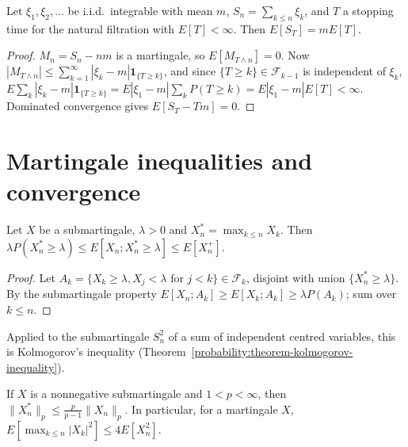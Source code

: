 \begin{theorem}\label{martingales:theorem-wald}
Let $\xi_1, \xi_2, \ldots$ be i.i.d.\ integrable with mean $m$, $S_n = \sum_{k \leq n}\xi_k$, and $T$ a stopping time for the natural filtration with $E[T] < \infty$. Then $E[S_T] = mE[T]$.
\end{theorem}

\begin{proof}
$M_n = S_n - nm$ is a martingale, so $E[M_{T \wedge n}] = 0$. Now $|M_{T \wedge n}| \leq \sum_{k=1}^\infty|\xi_k - m|\mathbf{1}_{\{T \geq k\}}$, and since $\{T \geq k\} \in \mathcal{F}_{k-1}$ is independent of $\xi_k$,
$E\sum_k|\xi_k - m|\mathbf{1}_{\{T \geq k\}} = E|\xi_1 - m|\sum_kP(T \geq k) = E|\xi_1 - m|E[T] < \infty$. Dominated convergence gives $E[S_T - Tm] = 0$.
\end{proof}

\section{Martingale inequalities and convergence}\label{martingales:section-convergence}

\begin{theorem}\label{martingales:theorem-doob-maximal}
Let $X$ be a submartingale, $\lambda > 0$ and $X_n^* = \max_{k \leq n}X_k$. Then $\lambda P(X_n^* \geq \lambda) \leq E[X_n; X_n^* \geq \lambda] \leq E[X_n^+]$.
\end{theorem}

\begin{proof}
Let $A_k = \{X_k \geq \lambda, X_j < \lambda \text{ for } j < k\} \in \mathcal{F}_k$, disjoint with union $\{X_n^* \geq \lambda\}$. By the submartingale property $E[X_n; A_k] \geq E[X_k; A_k] \geq \lambda P(A_k)$; sum over $k \leq n$.
\end{proof}

Applied to the submartingale $S_n^2$ of a sum of independent centred variables, this is Kolmogorov's inequality (Theorem~\ref{probability:theorem-kolmogorov-inequality}).

\begin{theorem}\label{martingales:theorem-doob-lp}
If $X$ is a nonnegative submartingale and $1 < p < \infty$, then $\|X_n^*\|_p \leq \frac{p}{p - 1}\|X_n\|_p$. In particular, for a martingale $X$, $E[\max_{k \leq n}|X_k|^2] \leq 4E[X_n^2]$.
\end{theorem}


